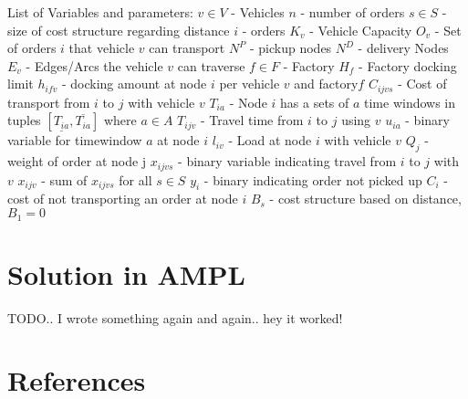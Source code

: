 \documentclass[a4paper,12pt]{article}
\begin{document}
List of Variables and parameters: \newline
$v \in V$ - Vehicles \newline
$n$ - number of orders\newline
$s \in S$ - size of cost structure regarding distance \newline
$i$ - orders\newline
$K_v$ - Vehicle Capacity \newline
$O_v$ - Set of orders $i$ that vehicle $v$ can transport \newline
$N^P$ - pickup nodes\newline
$N^D$ - delivery Nodes\newline
$E_v$ - Edges/Arcs the vehicle $v$ can traverse\newline
$f \in F$ - Factory\newline
$H_f$ - Factory docking limit\newline
$h_{ifv}$ - docking amount at node $i$ per vehicle $v$ and factory$f$ \newline
$C_{ijvs}$ - Cost of transport from $i$ to $j$ with vehicle $v$ \newline
$T_{ia}$ - Node $i$ has a sets of $a$ time windows in tuples $[ \underline{T_{ia}},  \overline{T_{ia}} ]$ where $a \in A$ \newline
$T_{ijv}$ - Travel time from $i$ to $j$ using $v$\newline
$u_{ia}$ - binary variable for timewindow $a$ at node $i$\newline 
$l_{iv}$ - Load at node $i$ with vehicle $v$ \newline
$Q_j$ - weight of order at node j \newline
$x_{ijvs}$ - binary variable indicating travel from $i$ to $j$ with $v$ \newline
$x_{ijv}$ - sum of $x_{ijvs}$ for all $s\in S$ \newline
$y_i$ - binary indicating order not picked up \newline
$C_i$ - cost of not transporting an order at node $i$ \newline
$B_s$ - cost structure based on distance, $B_1 = 0$ \newline

\section{Solution in AMPL}
TODO.. I wrote something again and again.. hey it worked!

\section{References} \label{sec:Ref}
\end{document}

